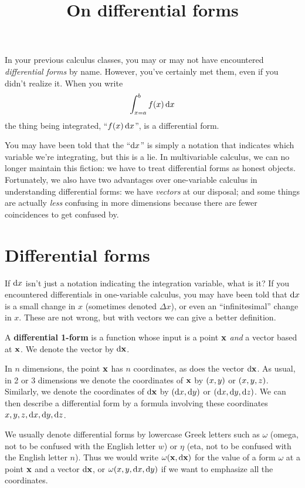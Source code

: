 \documentclass[12pt]{amsart}
\title{On differential forms}
\begin{document}
\maketitle

In your previous calculus classes, you may or may not have encountered \emph{differential forms} by name.
However, you've certainly met them, even if you didn't realize it.
When you write
\[ \int_{x=a}^b f(x) \,\mathrm{d} x \]
the thing being integrated, ``$f(x) \,\mathrm{d} x$'', is a differential form.

You may have been told that the ``$\mathrm{d} x$'' is simply a notation that indicates which variable we're integrating, but this is a lie.
In multivariable calculus, we can no longer maintain this fiction: we have to treat differential forms as honest objects.
Fortunately, we also have two advantages over one-variable calculus in understanding differential forms: we have \emph{vectors} at our disposal; and some things are actually \emph{less} confusing in more dimensions because there are fewer coincidences to get confused by.

\section{Differential forms}
\label{sec:differential-forms}

If $\mathrm{d} x$ isn't just a notation indicating the integration variable, what is it?
If you encountered differentials in one-variable calculus, you may have been told that $\mathrm{d} x$ is a small change in $x$ (sometimes denoted $\Delta x$), or even an ``infinitesimal'' change in $x$.
These are not wrong, but with vectors we can give a better definition.

\begin{defn}
  A \textbf{differential 1-form} is a function whose input is a point $\mathbf{x}$ \emph{and} a vector based at $\mathbf{x}$.
  We denote the vector by $\mathrm{d} \mathbf{x}$.
\end{defn}

In $n$ dimensions, the point $\mathbf{x}$ has $n$ coordinates, as does the vector $\mathrm{d} \mathbf{x}$.
As usual, in 2 or 3 dimensions we denote the coordinates of $\mathbf{x}$ by $(x,y)$ or $(x,y,z)$.
Similarly, we denote the coordinates of $\mathrm{d} \mathbf{x}$ by $(\mathrm{d} x,\mathrm{d} y)$ or $(\mathrm{d} x,\mathrm{d} y,\mathrm{d} z)$.
We can then describe a differential form by a formula involving these coordinates $x,y,z,\mathrm{d} x,\mathrm{d} y,\mathrm{d} z$.

We usually denote differential forms by lowercase Greek letters such as $\omega$ (omega, not to be confused with the English letter $w$) or $\eta$ (eta, not to be confused with the English letter $n$).
Thus we would write $\omega(\mathbf{x},\mathrm{d} \mathbf{x})$ for the value of a form $\omega$ at a point $\mathbf{x}$ and a vector $\mathrm{d} \mathbf{x}$, or $\omega(x,y,\mathrm{d} x,\mathrm{d} y)$ if we want to emphasize all the coordinates.
\end{document}
